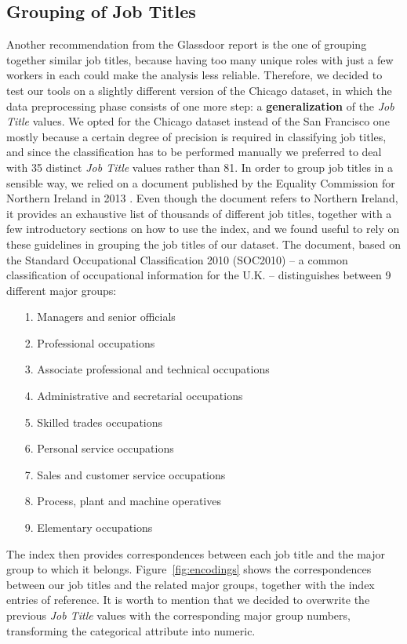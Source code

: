 \subsection{Grouping of Job Titles}
\label{section:grouping_job_titles}
Another recommendation from the Glassdoor report \cite{chamberlain2017analyze} is the one of grouping together similar job titles, because having too many unique roles with just a few workers in each could make the analysis less reliable. Therefore, we decided to test our tools on a slightly different version of the Chicago dataset, in which the data preprocessing phase consists of one more step: a \textbf{generalization} of the \textit{Job Title} values. We opted for the Chicago dataset instead of the San Francisco one mostly because a certain degree of precision is required in classifying job titles, and since the classification has to be performed manually we preferred to deal with 35 distinct \textit{Job Title} values rather than 81. In order to group job titles in a sensible way, we relied on a document published by the Equality Commission for Northern Ireland in 2013 \cite{equality2013index}. Even though the document refers to Northern Ireland, it provides an exhaustive list of thousands of different job titles, together with a few introductory sections on how to use the index, and we found useful to rely on these guidelines in grouping the job titles of our dataset. The document, based on the Standard Occupational Classification 2010 (SOC2010) -- a common classification of occupational information for the U.K. -- distinguishes between 9 different major groups:
\begin{itemize}
\item[1.] Managers and senior officials
\item[2.] Professional occupations
\item[3.] Associate professional and technical occupations
\item[4.] Administrative and secretarial occupations
\item[5.] Skilled trades occupations
\item[6.] Personal service occupations
\item[7.] Sales and customer service occupations
\item[8.] Process, plant and machine operatives
\item[9.] Elementary occupations
\end{itemize}
The index then provides correspondences between each job title and the major group to which it belongs. Figure~\ref{fig:encodings} shows the correspondences between our job titles and the related major groups, together with the index entries of reference. It is worth to mention that we decided to overwrite the previous \textit{Job Title} values with the corresponding major group numbers, transforming the categorical attribute into numeric.

